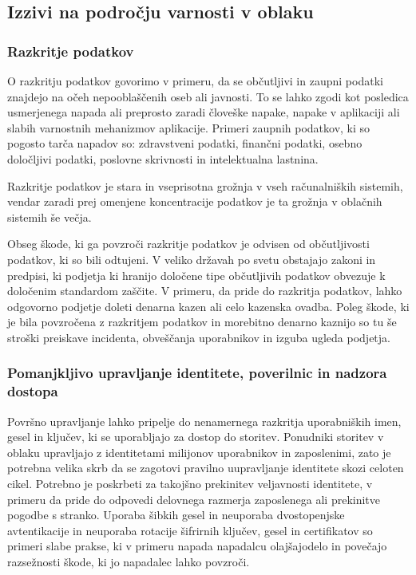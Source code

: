 \documentclass[12pt,a4paper,openany]{book}
\begin{document}
\subsection{Izzivi na področju varnosti v oblaku}

\subsubsection{Razkritje podatkov}
O razkritju podatkov govorimo v primeru, da se občutljivi in zaupni podatki znajdejo na očeh nepooblaščenih oseb ali javnosti.  To se lahko zgodi kot posledica usmerjenega napada ali preprosto zaradi človeške napake, napake v aplikaciji ali slabih varnostnih mehanizmov aplikacije. Primeri zaupnih podatkov, ki so pogosto tarča napadov so: zdravstveni podatki, finančni podatki, osebno določljivi podatki, poslovne skrivnosti in intelektualna lastnina.

Razkritje podatkov je stara in vseprisotna grožnja v vseh računalniških sistemih, vendar zaradi prej omenjene koncentracije podatkov je ta grožnja v oblačnih sistemih še večja.

Obseg škode, ki ga povzroči razkritje podatkov je odvisen od občutljivosti podatkov, ki so bili odtujeni. V veliko državah po svetu obstajajo zakoni in predpisi, ki podjetja ki hranijo določene tipe občutljivih podatkov obvezuje k določenim standardom zaščite. V primeru, da pride do razkritja podatkov, lahko odgovorno podjetje doleti denarna kazen ali celo kazenska ovadba. Poleg škode, ki je bila povzročena z razkritjem podatkov in morebitno denarno kaznijo so tu še stroški preiskave incidenta, obveščanja uporabnikov in izguba ugleda podjetja.

\subsubsection{Pomanjkljivo upravljanje identitete, poverilnic in nadzora dostopa}
Površno upravljanje lahko pripelje do nenamernega razkritja uporabniških imen, gesel in ključev, ki se uporabljajo za dostop do storitev. Ponudniki storitev v oblaku upravljajo z identitetami milijonov uporabnikov in zaposlenimi, zato je potrebna velika skrb da se zagotovi pravilno uupravljanje identitete skozi celoten cikel. Potrebno je poskrbeti za takojšno prekinitev veljavnosti identitete, v primeru da pride do odpovedi delovnega razmerja zaposlenega ali prekinitve pogodbe s stranko. Uporaba šibkih gesel in neuporaba dvostopenjske avtentikacije in neuporaba rotacije šifrirnih ključev, gesel in certifikatov so primeri slabe prakse, ki v primeru napada napadalcu olajšajodelo in povečajo razsežnosti škode, ki jo napadalec lahko povzroči.
\end{document}
